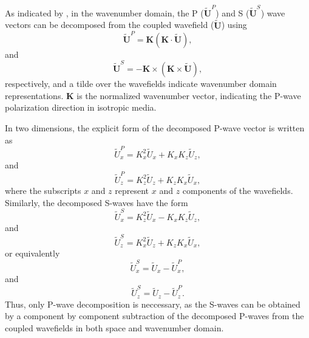 \documentclass[manuscript,ulem,graphix,revised]{geophysics}
\begin{document}
%
As indicated by \citet{zhang10}, in the wavenumber domain, the P ($\tilde{\boldsymbol{U}}^P$) and S ($\tilde{\boldsymbol{U}}^S$) wave vectors can be decomposed from the coupled wavefield ($\tilde{\boldsymbol{U}}$) using
\begin{equation}
\tilde{\boldsymbol{U}}^P = \boldsymbol{K} (\boldsymbol{K} \cdot \tilde{\boldsymbol{U}}),
\label{eqn:p_wave}
\end{equation}
and
\begin{equation}
\tilde{\boldsymbol{U}}^S =-\boldsymbol{K} \times (\boldsymbol{K} \times \tilde{\boldsymbol{U}}),
\label{eqn:p_wave}
\end{equation}
respectively, and a tilde over the wavefields indicate wavenumber domain representations. $\boldsymbol{K}$ is the normalized wavenumber vector, indicating the P-wave polarization direction in isotropic media.

In two dimensions, the explicit form of the decomposed P-wave vector is written as
\begin{equation}
\tilde{U}^P_x = K^2_x \tilde{U}_x + K_x K_z \tilde{U}_z,
\label{eqn:p_wave1}
\end{equation}
and 
\begin{equation}
\tilde{U}^P_z = K^2_z \tilde{U}_z + K_z K_x \tilde{U}_x,
\label{eqn:p_wave2}
\end{equation}
where the subscripts $x$ and $z$ represent $x$ and $z$ components of the wavefields. Similarly, the decomposed S-waves have the form
\begin{equation}
\tilde{U}^S_x = K^2_z \tilde{U}_x - K_x K_z \tilde{U}_z,
\label{eqn:s_wave1}
\end{equation}
and 
\begin{equation}
\tilde{U}^S_z = K^2_x \tilde{U}_z + K_z K_x \tilde{U}_x,
\label{eqn:s_wave2}
\end{equation}
or equivalently
\begin{equation}
\tilde{U}^S_x = \tilde{U}_x - \tilde{U}^P_x,
\label{eqn:s_wave3}
\end{equation}
and 
\begin{equation}
\tilde{U}^S_z = \tilde{U}_z - \tilde{U}^P_z.
\label{eqn:s_wave4}
\end{equation}
Thus, only P-wave decomposition is neccessary, as the S-waves can be obtained by a component by component subtraction of the decomposed P-waves from the coupled wavefields in both space and wavenumber domain.
\end{document}
